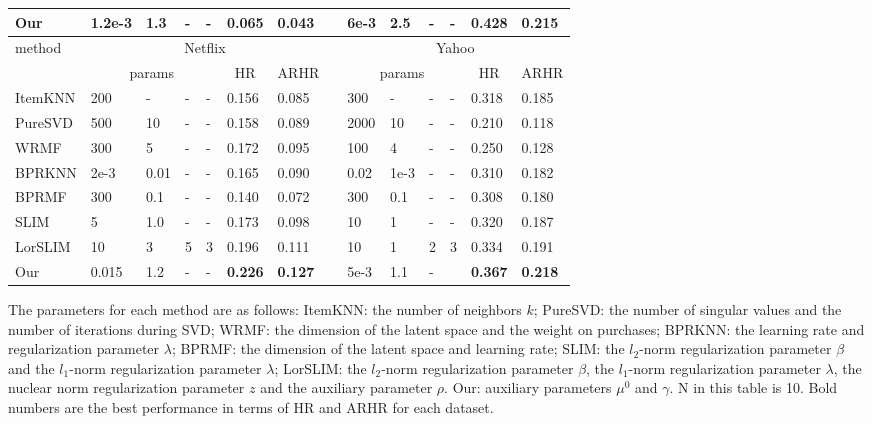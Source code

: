 \documentclass[letterpaper]{article}
\begin{document}
\begin{table}[ht]
\begin{center}
\begin{threeparttable}
\begin{tabular}{llllllllllllll}
Our&1.2e-3&1.3&-&-&\bf{0.065}&\bf{0.043}&&6e-3&2.5&-&-&\bf{0.428}&\bf{0.215}\\
\hline\hline
\multirow{2}{*}{method} &
\multicolumn{6}{c}{Netflix} &
\multicolumn{1}{c}{}&
\multicolumn{6}{c}{Yahoo} \\
\cline{2-7} \cline{9-14}
  & \multicolumn{4}{c}{params} &\multicolumn{1}{c}{HR}  & \multicolumn{1}{c}{ARHR} &\multicolumn{1}{c}{}&\multicolumn{4}{c}{params} &\multicolumn{1}{c}{HR}  & \multicolumn{1}{c}{ARHR} \\
\hline
ItemKNN&200&-&-&-&0.156&0.085&&300&-&-&-&0.318&0.185\\
PureSVD&500&10&-&-&0.158&0.089&&2000&10&-&-&0.210&0.118\\
WRMF&300&5&-&-&0.172&0.095&&100&4&-&-&0.250&0.128\\
BPRKNN&2e-3&0.01&-&-&0.165&0.090&&0.02&1e-3&-&-&0.310&0.182\\
BPRMF&300&0.1&-&-&0.140&0.072&&300&0.1&-&-&0.308&0.180\\
SLIM&5&1.0&-&-&0.173&0.098&&10&1&-&-&0.320&0.187\\
LorSLIM&10&3&5&3&0.196&0.111&&10&1&2&3&0.334&0.191\\
Our&0.015&1.2&-&-&\bf{0.226}&\bf{0.127}&&5e-3&1.1&-&&\bf{0.367}&\bf{0.218}\\
\hline
\end{tabular}%

   \begin{tablenotes}


      \item The parameters for each method are as follows: ItemKNN: the number of neighbors $k$; PureSVD: the number of singular values and the number of iterations during SVD; WRMF: the dimension of the latent space and the weight on purchases; BPRKNN: the learning rate and regularization parameter $\lambda$; BPRMF: the dimension of the latent space and learning rate; SLIM: the $l_2$-norm regularization parameter $\beta$ and the $l_1$-norm regularization parameter
$\lambda$; LorSLIM: the $l_2$-norm regularization parameter $\beta$, the $l_1$-norm regularization parameter $\lambda$, the nuclear norm regularization parameter $z$ and the auxiliary parameter $\rho$. Our: auxiliary parameters $\mu^0$ and $\gamma$. N in this table is 10. Bold numbers are the best performance in terms of HR and ARHR for each dataset.

 \end{tablenotes}
\end{threeparttable}
\end{center}
\end{table}
\end{document}
